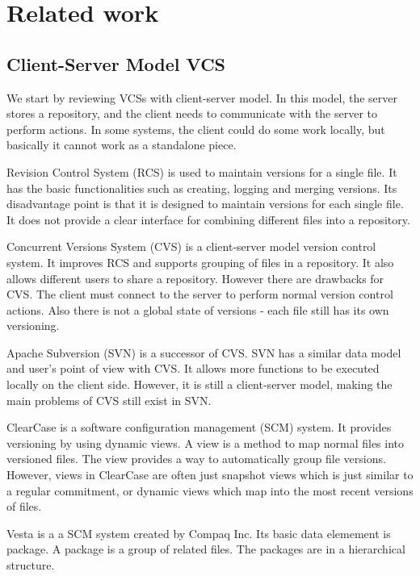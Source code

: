 \section{Related work}
\label{s:related}
\label{s:relwork}

\subsection{Client-Server Model VCS}
We start by reviewing VCSs with client-server model. In this model, the server
stores a repository, and the client needs to communicate with the server to
perform actions. In some systems, the client could do some work locally, but
basically it cannot work as a standalone piece.

Revision Control System (RCS)\cite{tichy82rcs} is used to maintain versions for a single file. It
has the basic functionalities such as creating, logging and merging versions.
Its disadvantage point is that it is designed to maintain versions for each
single file. It does not provide a clear interface for combining different files
into a repository.

Concurrent Versions System (CVS)\cite{cvs} is a client-server model version control
system. It improves RCS and supports grouping of files in a repository. It also
allows different users to share a repository. However there are drawbacks for
CVS. The client must connect to the server to perform normal version control
actions. Also there is not a global state of versions - each file still has its
own versioning.

Apache Subversion (SVN)\cite{svn} is a successor of CVS. SVN has a similar data model and
user's point of view with CVS. It allows more functions to be executed locally
on the client side. However, it is still a client-server model, making the main
problems of CVS still exist in SVN.

ClearCase\cite{clearcase} is a software configuration management (SCM) system. It provides versioning
by using dynamic views. A view is a method to map normal files into versioned
files. The view provides a way to automatically group file versions. However,
views in ClearCase are often just snapshot views which is just similar to a
regular commitment, or dynamic views which map into the most recent versions of
files.

Vesta\cite{vesta} is a a SCM system created by Compaq Inc. Its basic data elemement is
package. A package is a group of related files. The packages are in a
hierarchical structure.

